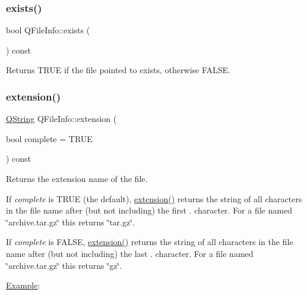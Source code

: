 \subsubsection{\texorpdfstring{exists()}{exists()}}
{\footnotesize\ttfamily bool Q\+File\+Info\+::exists (\begin{DoxyParamCaption}{ }\end{DoxyParamCaption}) const}

Returns T\+R\+UE if the file pointed to exists, otherwise F\+A\+L\+SE. \mbox{\label{class_q_file_info_aea9896c7746e79f76b66b1bd71631520}} 
\subsubsection{\texorpdfstring{extension()}{extension()}}
{\footnotesize\ttfamily \mbox{\hyperlink{class_q_string}{Q\+String}} Q\+File\+Info\+::extension (\begin{DoxyParamCaption}\item[{bool}]{complete = {\ttfamily TRUE} }\end{DoxyParamCaption}) const}

Returns the extension name of the file.

If {\itshape complete} is T\+R\+UE (the default), \mbox{\hyperlink{class_q_file_info_aea9896c7746e79f76b66b1bd71631520}{extension()}} returns the string of all characters in the file name after (but not including) the first \textquotesingle{}.\textquotesingle{} character. For a file named \char`\"{}archive.\+tar.\+gz\char`\"{} this returns \char`\"{}tar.\+gz\char`\"{}.

If {\itshape complete} is F\+A\+L\+SE, \mbox{\hyperlink{class_q_file_info_aea9896c7746e79f76b66b1bd71631520}{extension()}} returns the string of all characters in the file name after (but not including) the last \textquotesingle{}.\textquotesingle{} character. For a file named \char`\"{}archive.\+tar.\+gz\char`\"{} this returns \char`\"{}gz\char`\"{}.

\mbox{\hyperlink{struct_example}{Example}}\+: 
\begin{DoxyCode}{0}
\end{DoxyCode}


